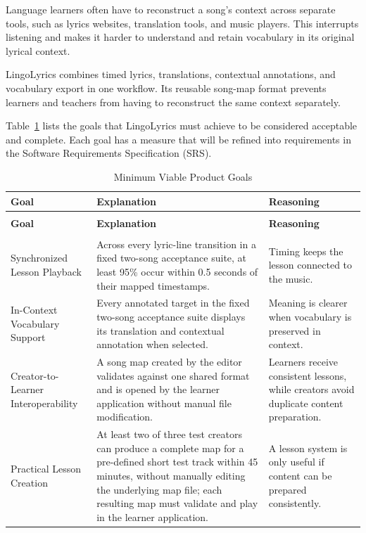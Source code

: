 \documentclass{article}
\renewcommand{\progname}{LingoLyrics}
\begin{document}
Language learners often have to reconstruct a song's context across separate
tools, such as lyrics websites, translation tools, and music players. This
interrupts listening and makes it harder to understand and retain vocabulary
in its original lyrical context.

\progname{} combines timed lyrics, translations, contextual annotations, and
vocabulary export in one workflow. Its reusable song-map format prevents
learners and teachers from having to reconstruct the same context separately.

Table~\ref{TblGoals} lists the goals that \progname{} must achieve to be
considered acceptable and complete. Each goal has a measure that will be
refined into requirements in the Software Requirements Specification (SRS).

\begin{longtable}{@{}>{\raggedright\arraybackslash}p{}
                       >{\raggedright\arraybackslash}p{}
                       >{\raggedright\arraybackslash}p{}@{}}
\caption{Minimum Viable Product Goals}\label{TblGoals}\\
\toprule
\textbf{Goal} & \textbf{Explanation} & \textbf{Reasoning}\\
\midrule
\endfirsthead
\multicolumn{3}{c}{\tablename\ \thetable{} -- continued from previous page}\\
\toprule
\textbf{Goal} & \textbf{Explanation} & \textbf{Reasoning}\\
\midrule
\endhead
\midrule
\multicolumn{3}{r}{Continued on next page}\\
\endfoot
\bottomrule
\endlastfoot
Synchronized Lesson Playback & Across every lyric-line transition in a fixed two-song acceptance suite, at least 95\% occur within 0.5 seconds of their mapped timestamps. & Timing keeps the lesson connected to the music.\\
\addlinespace
In-Context Vocabulary Support & Every annotated target in the fixed two-song acceptance suite displays its translation and contextual annotation when selected. & Meaning is clearer when vocabulary is preserved in context.\\
\addlinespace
Creator-to-Learner Interoperability & A song map created by the editor validates against one shared format and is opened by the learner application without manual file modification. & Learners receive consistent lessons, while creators avoid duplicate content preparation.\\
\addlinespace
Practical Lesson Creation & At least two of three test creators can produce a complete map for a pre-defined short test track within 45 minutes, without manually editing the underlying map file; each resulting map must validate and play in the learner application. & A lesson system is only useful if content can be prepared consistently.\\

\end{longtable}
\end{document}
